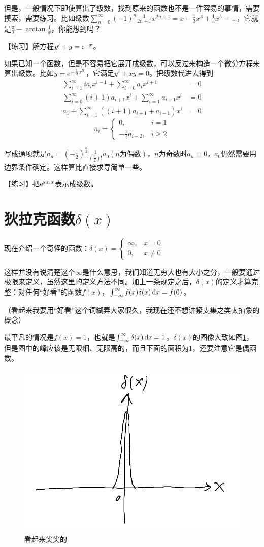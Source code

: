 但是，一般情况下即使算出了级数，找到原来的函数也不是一件容易的事情，需要摸索，需要练习。比如级数$\sum_{n=0}^{\infty} (-1)^n \frac{1}{2n+1} x^{2n+1}=x-\frac{1}{3} x^3+\frac{1}{5} x^5-\dots$，它就是$\frac{\pi}{2}-\arctan \frac{1}{x}$，你能想到吗？

【练习】解方程$y'+y=\mathrm{e}^{-x}$。

如果已知一个函数，但是不容易把它展开成级数，可以反过来构造一个微分方程来算出级数。比如$y=\mathrm{e}^{-\frac{1}{2} x^2}$，它满足$y'+x y=0$。把级数代进去得到
\begin{align*}
\sum_{i=1}^{\infty} i a_i x^{i-1}+\sum_{i=0}^{\infty} a_i x^{i+1}&=0 \\
\sum_{i=0}^{\infty} (i+1) a_{i+1} x^i+\sum_{i=1}^{\infty} a_{i-1} x^i&=0 \\
a_1+\sum_{i=1}^{\infty} ((i+1) a_{i+1}+a_{i-1}) x^i&=0
\end{align*}
\begin{equation*}
a_i=\begin{cases}
0, &i=1 \\
-\frac{1}{i} a_{i-2}, &i \ge 2
\end{cases}
\end{equation*}

写成通项就是$a_n=(-\frac{1}{2})^{\frac{n}{2}} \frac{1}{(\frac{n}{2})!} a_0 (n \text{为偶数})$，$n$为奇数时$a_n=0$，$a_0$仍然需要用边界条件确定。这样算比直接求导简单一些。

【练习】把$\mathrm{e}^{\sin x}$表示成级数。
\section{狄拉克函数$\delta(x)$}
现在介绍一个奇怪的函数：$\delta(x)=\begin{cases} \infty, &x=0 \\ 0, &x \neq 0 \end{cases}$

这样并没有说清楚这个$\infty$是什么意思，我们知道无穷大也有大小之分，一般要通过极限来定义，虽然这里的定义方法不同。加上一条规定之后，$\delta(x)$的定义才算完整：对任何“好看”的函数$f(x)$，$\int_{-\infty}^{\infty} f(x) \delta(x) \mathop{}\!\mathrm{d} x=f(0)$。

（看起来我要用“好看”这个词糊弄大家很久，我现在还不想讲紧支集之类太抽象的概念）

最平凡的情况是$f(x)=1$，也就是$\int_{-\infty}^{\infty} \delta(x) \mathop{}\!\mathrm{d} x=1$。$\delta(x)$的图像大致如图\ref{fig-delta-x}，但是图中的峰应该是无限细、无限高的，而且下面的面积为$1$，还要注意它是偶函数。
\begin{figure}[htb]
\centering
\includegraphics[width=0.33\linewidth]{fig/delta-x.png}
\caption{看起来尖尖的}
\label{fig-delta-x}
\end{figure}

